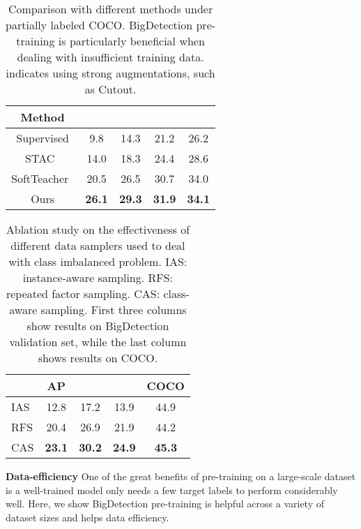 \documentclass[10pt,twocolumn,letterpaper]{article}
\begin{document}
\begin{table}[t]
\begin{center}
        \begin{tabular}{ccccc}
            \toprule
            Method &  &  &  &  \\
            \midrule
            Supervised  & 9.8 & 14.3 & 21.2 & 26.2 \\
            STAC~\cite{sohn2020simple} & 14.0 & 18.3 & 24.4 & 28.6 \\
            SoftTeacher~\cite{xu2021end} & 20.5 & 26.5 & 30.7 & 34.0 \\
            \midrule
            Ours        & \textbf{26.1} & \textbf{29.3} & \textbf{31.9} & \textbf{34.1} \\
            \bottomrule
        \end{tabular}
    \end{center}
    \vspace{-2ex}
    \caption{Comparison with different methods under partially labeled COCO. BigDetection pre-training is particularly beneficial when dealing with insufficient training data.  indicates using strong augmentations, such as Cutout.}
    \label{tab:data-efficiency}
    \vspace{-2ex}
\end{table} \begin{table}[t]
\begin{center}
        \begin{tabular}{l|cccc}
            \toprule
             & AP &  &  & COCO \\
            \midrule
            IAS & 12.8 & 17.2 & 13.9 & 44.9 \\
            RFS & 20.4 & 26.9 & 21.9 & 44.2 \\
            CAS & \textbf{23.1} & \textbf{30.2} & \textbf{24.9} & \textbf{45.3} \\
            \bottomrule
        \end{tabular}
    \end{center}
    \vspace{-2ex}
    \caption{Ablation study on the effectiveness of different data samplers used to deal with class imbalanced problem. IAS: instance-aware sampling. RFS: repeated factor sampling. CAS: class-aware sampling. First three columns show results on BigDetection validation set, while the last column shows results on COCO.}
    \label{tab:sampler}
    \vspace{-2ex}
\end{table} \noindent \textbf{Data-efficiency}
One of the great benefits of pre-training on a large-scale dataset is a well-trained model only needs a few target labels to perform considerably well. Here, we show BigDetection pre-training is helpful across a variety of dataset sizes and helps data efficiency.
\end{document}
